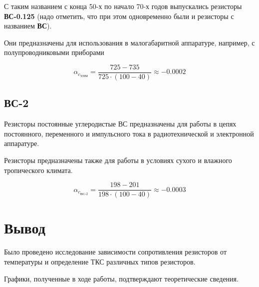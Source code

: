 С таким названием с конца 50-х по начало 70-х годов выпускались резисторы \textbf{ВС-0.125} (надо отметить, что при этом одновременно были и резисторы с названием \textbf{ВС}).

Они предназначены для использования в малогабаритной аппаратуре, например, с полупроводниковыми приборами

\begin{figure}[H]
	\centering
\end{figure}

\[
\alpha_{c_\text{УЛМ}} = \frac{725-735}{ 725 \cdot (100-40)} \approx -0.0002
\]

\subsection{ВС-2}

Резисторы постоянные углеродистые ВС предназначены для работы в цепях постоянного, переменного и импульсного тока в радиотехнической и электронной аппаратуре.

Резисторы предназначены также для работы в условиях сухого и влажного тропического климата.

\begin{figure}[H]
	\centering
\end{figure}

\[
\alpha_{c_\text{ВС-2}} = \frac{198-201}{ 198 \cdot (100-40)} \approx -0.0003
\]



\section{Вывод}

Было проведено исследование зависимости сопротивления резисторов от температуры и определение ТКС различных типов резисторов.

Графики, полученные в ходе работы, подтверждают теоретические сведения.

